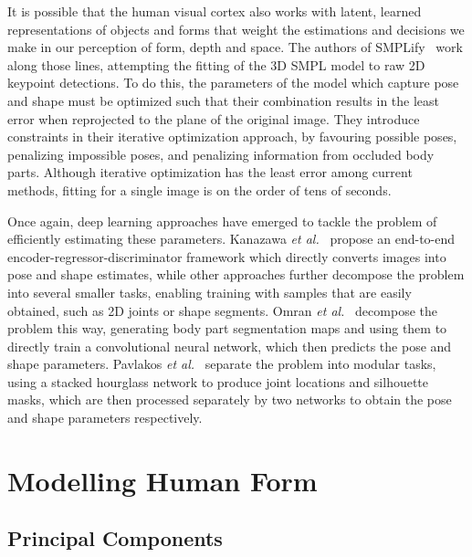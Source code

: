 \documentclass[9pt,twocolumn]{article}
\begin{document}
	\par{It is possible that the human visual cortex also works with latent, learned representations
	of objects and forms that weight the estimations and decisions we make in our perception of
	form, depth and space. The authors of SMPLify~\cite{smplify} work along those lines, attempting
	the fitting of the 3D SMPL model to raw 2D keypoint detections. To do this, the parameters of
	the model which capture pose and shape must be optimized such that their combination results in
	the least error when reprojected to the plane of the original image. They introduce constraints in
	their iterative optimization approach, by favouring possible poses, penalizing impossible poses,
	and penalizing information from occluded body parts. Although iterative optimization has the
	least error among current methods, fitting for a single image is on the order of tens of
	seconds.}\\

	\par{Once again, deep learning approaches have emerged to tackle the problem of efficiently
	estimating these parameters. Kanazawa \textit{et al.}~\cite{hmr} propose an end-to-end
	encoder-regressor-discriminator framework which directly converts images into pose and
	shape estimates, while other approaches further decompose the problem into several smaller
	tasks, enabling training with samples that are easily obtained, such as 2D joints or shape
	segments. Omran \textit{et al.}~\cite{nbf} decompose the problem this way, generating
	body part segmentation maps and using them to directly train a convolutional neural network,
	which then predicts the pose and shape parameters. Pavlakos \textit{et al.}~\cite{humanshape}
	separate the problem into modular tasks, using a stacked hourglass network to produce joint
	locations and silhouette masks, which are then processed separately by two networks to
	obtain the pose and shape parameters respectively.}

\section{Modelling Human Form}

	\subsection{Principal Components}
\end{document}
